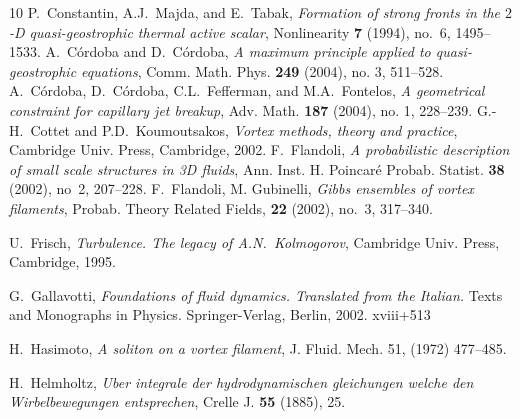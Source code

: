 \documentclass[a4paper,11pt]{article}
\numberwithin{equation}{section}
\begin{document}
\begin{thebibliography}{10}
%
%
%
P.~Constantin, A.J.~Majda, and E.~Tabak, \emph{Formation of strong
  fronts in the $2$-{D} quasi-geostrophic thermal active scalar},
  Nonlinearity \textbf{7} (1994), no.~6, 1495--1533.
%
A.~C\'ordoba and D.~C\'ordoba, \emph{A maximum principle applied to
    quasi-geostrophic equations}, Comm. Math. Phys. \textbf{249}
    (2004), no. 3, 511--528.
%
A.~C\'ordoba, D.~C\'ordoba, C.L.~Fefferman, and M.A.~Fontelos,
  \emph{A geometrical constraint for capillary jet breakup}, Adv.
  Math. \textbf{187} (2004), no. 1, 228--239.
%
G.-H.~Cottet and P.D.~Koumoutsakos, \emph{Vortex methods, theory and
  practice}, Cambridge Univ. Press, Cambridge, 2002. 
F.~Flandoli, \emph{A probabilistic description of small scale
    structures in 3D fluids}, Ann. Inst. H. Poincar\'e Probab.
    Statist. \textbf{38} (2002), no~2, 207--228.
%
%
 F.~Flandoli, M. Gubinelli, \emph{Gibbs ensembles of vortex
    filaments}, Probab. Theory Related Fields, \textbf{22} (2002),
  no.~3, 317--340.

U.~Frisch, \emph{Turbulence. The legacy of A.N.~Kolmogorov}, Cambridge
Univ. Press, Cambridge, 1995.

G.~Gallavotti, \emph{Foundations of fluid dynamics. Translated from
  the Italian.} Texts and Monographs in Physics.  Springer-Verlag,
  Berlin, 2002. xviii+513

H.~Hasimoto, \emph{A soliton on a vortex filament}, J. Fluid. Mech.
51, (1972) 477--485.

H.~Helmholtz, \emph{Uber integrale der hydrodynamischen gleichungen
  welche den Wirbelbewe\-gungen entsprechen}, Crelle J. \textbf{55}
  (1885), 25.


\end{thebibliography}
\end{document}
